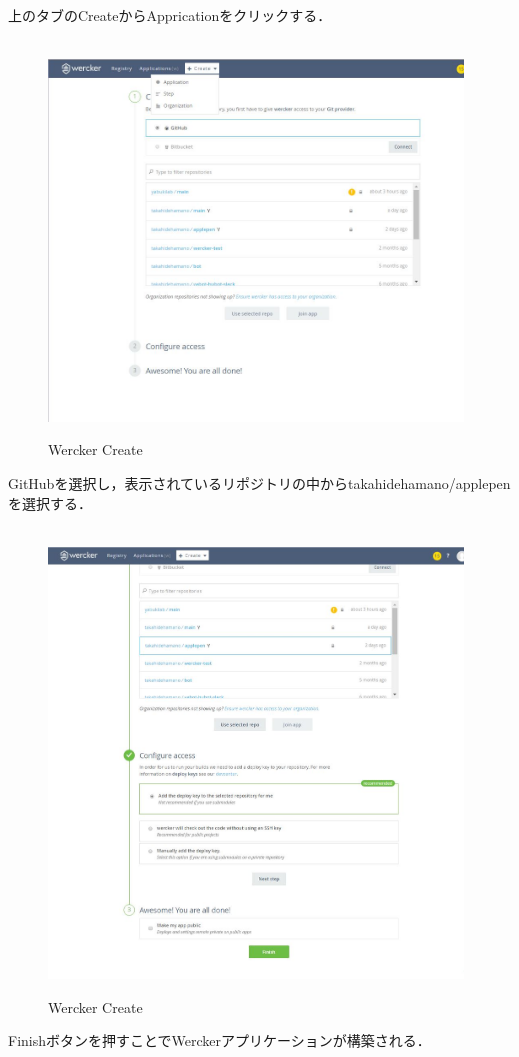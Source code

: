 \newpage

上のタブのCreateからAppricationをクリックする．

\begin{figure}[htb]
\centering　
\includegraphics[width=11cm]{15.JPG}
\caption{Wercker Create}\label{tab:uac}
\end{figure}
GitHubを選択し，表示されているリポジトリの中からtakahidehamano/applepenを選択する．
\newpage
\begin{figure}[htb]
\centering　
\includegraphics[width=11cm]{16.JPG}
\caption{Wercker Create}\label{tab:uac}
\end{figure}
Finishボタンを押すことでWerckerアプリケーションが構築される．

